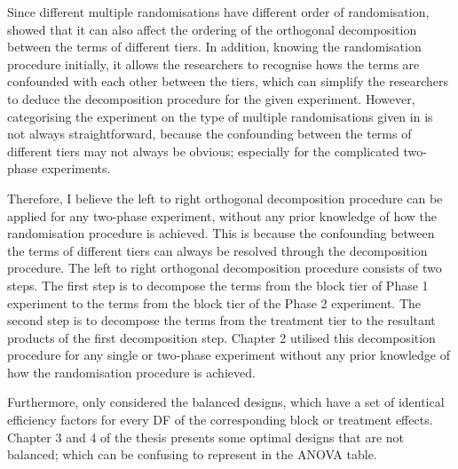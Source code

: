 \documentclass[11pt,a4paper]{article}
\begin{document}
Since different multiple randomisations have different order of randomisation, \cite{Brien2009, Brien2010} showed that it can also affect the ordering of the orthogonal  decomposition between the terms of different tiers. In addition, knowing the randomisation procedure initially, it allows the researchers to recognise hows the terms are confounded with each other between the tiers, which can simplify the researchers to deduce the decomposition procedure for the given experiment. However, categorising the experiment on the type of multiple randomisations given in \cite{Brien2006b} is not always straightforward, because the confounding between the terms of different tiers may not always be obvious; especially for the complicated two-phase experiments. 

Therefore, I believe the left to right orthogonal decomposition procedure can be applied for any two-phase experiment, without any prior knowledge of how the randomisation procedure is achieved. This is because the confounding between the terms of different tiers can always be resolved through the decomposition procedure. The left to right orthogonal decomposition procedure consists of two steps. The first step is to decompose the terms from the block tier of Phase 1 experiment to the terms from the block tier of the Phase 2 experiment. The second step is to decompose the terms from the treatment tier to the resultant products of the first decomposition step. Chapter 2 utilised this decomposition procedure for any single or two-phase experiment without any prior knowledge of how the randomisation procedure is achieved. 

Furthermore, \cite{Brien2009, Brien2010} only considered the balanced designs, which have a set of identical efficiency factors for every DF of the corresponding block or treatment effects. Chapter 3 and 4 of the thesis presents some optimal designs that are not balanced; which can be confusing to represent in the ANOVA table.  




\end{document}

